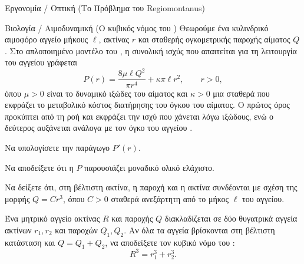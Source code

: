 \begin{problhma}{Εργονομία / Οπτική (Το Πρόβλημα του Regiomontanus)}
\begin{center}
\end{center}
\end{problhma}

\begin{problhma}{Βιολογία / Αιμοδυναμική (Ο κυβικός νόμος του )}
Θεωρούμε ένα κυλινδρικό αιμοφόρο αγγείο μήκους $\ell$, ακτίνας $r$
και σταθερής ογκομετρικής παροχής αίματος $Q$. Στο απλοποιημένο
μοντέλο του , η συνολική ισχύς που απαιτείται για τη λειτουργία
του αγγείου γράφεται
\[
  P(r)
  =\frac{8\mu\ell Q^2}{\pi r^4}
  +\kappa\pi\ell r^2,
  \qquad r>0,
\]
όπου $\mu>0$ είναι το δυναμικό ιξώδες του αίματος και $\kappa>0$ μια
σταθερά που εκφράζει το μεταβολικό κόστος διατήρησης του όγκου του
αίματος. Ο πρώτος όρος προκύπτει από τη ροή  και
εκφράζει την ισχύ που χάνεται λόγω ιξώδους, ενώ ο δεύτερος αυξάνεται
ανάλογα με τον όγκο του αγγείου
\cite{murray1926minimumWork,hagmeijer2018murrayReview}.

\begin{alist}
  \item Να υπολογίσετε την παράγωγο $P'(r)$.
  \item Να αποδείξετε ότι η $P$ παρουσιάζει μοναδικό ολικό ελάχιστο.
  \item Να δείξετε ότι, στη βέλτιστη ακτίνα, η παροχή και η ακτίνα
        συνδέονται με σχέση της μορφής $Q=Cr^3$,
        όπου $C>0$ σταθερά ανεξάρτητη από το μήκος $\ell$ του αγγείου.
  \item Ένα μητρικό αγγείο ακτίνας $R$ και παροχής $Q$ διακλαδίζεται σε
        δύο θυγατρικά αγγεία ακτίνων $r_1,r_2$ και παροχών $Q_1,Q_2$.
        Αν όλα τα αγγεία βρίσκονται στη βέλτιστη κατάσταση και
        $Q=Q_1+Q_2$, να αποδείξετε τον κυβικό νόμο του :
        \[
          R^3=r_1^3+r_2^3.
        \]
\end{alist}
\end{problhma}

